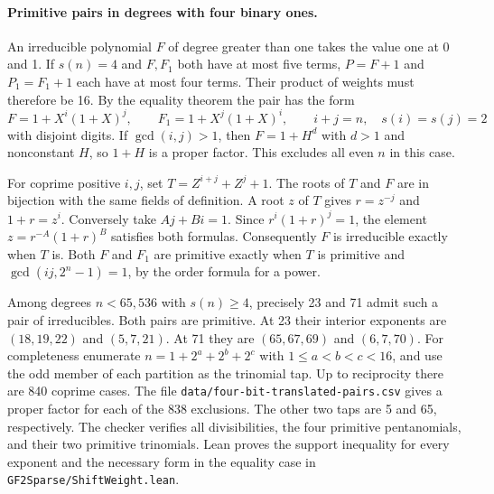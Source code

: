 \documentclass[11pt]{article}
\begin{document}
\paragraph{Primitive pairs in degrees with four binary ones.}
An irreducible polynomial \(F\) of degree greater than one takes the
value one at 0 and 1. If \(s(n)=4\) and \(F,F_1\) both have at most
five terms, \(P=F+1\) and \(P_1=F_1+1\) each have at most four terms.
Their product of weights must therefore be 16. By the equality
theorem the pair has the form
\[
 F=1+X^i(1+X)^j,\qquad F_1=1+X^j(1+X)^i,\qquad
 i+j=n,\quad s(i)=s(j)=2
\]
with disjoint digits. If \(\gcd(i,j)>1\), then \(F=1+H^d\) with
\(d>1\) and nonconstant \(H\), so \(1+H\) is a proper factor.
This excludes all even \(n\) in this case.

For coprime positive \(i,j\), set \(T=Z^{i+j}+Z^j+1\).
The roots of \(T\) and \(F\) are in bijection with the same fields
of definition. A root \(z\) of \(T\) gives
\(r=z^{-j}\) and \(1+r=z^i\). Conversely take \(Aj+Bi=1\). Since
\(r^i(1+r)^j=1\), the element \(z=r^{-A}(1+r)^B\) satisfies both
formulas. Consequently \(F\) is irreducible exactly when \(T\) is.
Both \(F\) and \(F_1\) are primitive exactly when \(T\) is primitive
and \(\gcd(ij,2^n-1)=1\), by the order formula for a power.

Among degrees \(n<65{,}536\) with \(s(n)\ge4\), precisely 23 and 71
admit such a pair of irreducibles. Both pairs are primitive. At 23
their interior exponents are \((18,19,22)\) and \((5,7,21)\).
At 71 they are \((65,67,69)\) and \((6,7,70)\).
For completeness enumerate \(n=1+2^a+2^b+2^c\) with
\(1\le a<b<c<16\), and use the odd member of each partition as the
trinomial tap. Up to reciprocity there are 840 coprime cases.
The file \nolinkurl{data/four-bit-translated-pairs.csv} gives a
proper factor for each of the 838 exclusions. The other two taps are
5 and 65, respectively. The checker verifies all divisibilities,
the four primitive pentanomials, and their two primitive trinomials.
Lean proves the support inequality for every exponent and the necessary
form in the equality case in \nolinkurl{GF2Sparse/ShiftWeight.lean}.
\end{document}
